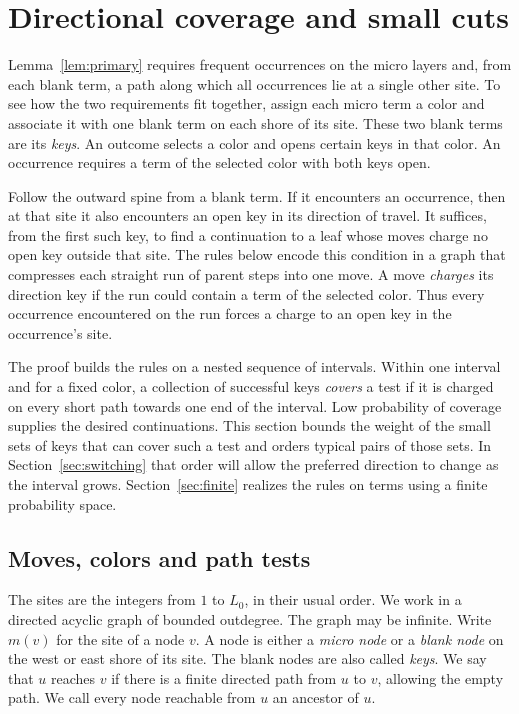 \section{Directional coverage and small cuts}\label{sec:probability}

Lemma~\ref{lem:primary} requires frequent occurrences on the micro
layers and, from each blank term, a path along which all occurrences lie
at a single other site. To see how the two requirements fit together,
assign each micro term a color and associate it with one blank term on
each shore of its site. These two blank terms are its \emph{keys}. An
outcome selects a color and opens certain keys in that color. An
occurrence requires a term of the selected color with both keys open.

Follow the outward spine from a blank term. If it encounters an
occurrence, then at that site it also encounters an open key in its
direction of travel. It suffices, from the first such key, to find a
continuation to a leaf whose moves charge no open key outside that
site. The rules below encode this condition in a graph that compresses
each straight run of parent steps into one move. A move \emph{charges}
its direction key if the run could contain a term of the selected color.
Thus every occurrence encountered on the run forces a charge to an
open key in the occurrence's site.

The proof builds the rules on a nested sequence of intervals. Within
one interval and for a fixed color, a collection of successful keys
\emph{covers} a test if it is charged on every short path towards one
end of the interval. Low probability of coverage supplies the desired
continuations. This section bounds the weight of the small sets of keys
that can cover such a test and orders typical pairs of those sets. In
Section~\ref{sec:switching} that order will allow the preferred direction
to change as the interval grows. Section~\ref{sec:finite} realizes the
rules on terms using a finite probability space.

\subsection{Moves, colors and path tests}

The sites are the integers from $1$ to $L_0$, in their usual order.
We work in a directed acyclic graph of bounded outdegree. The graph may
be infinite. Write $m(v)$ for the site of a node $v$. A node is either
a \emph{micro node} or a \emph{blank node} on the west or east shore of its site. The
blank nodes are also called \emph{keys}. We say that $u$ reaches $v$ if
there is a finite directed path from $u$ to $v$, allowing the empty path.
We call every node reachable from $u$ an ancestor of $u$.

